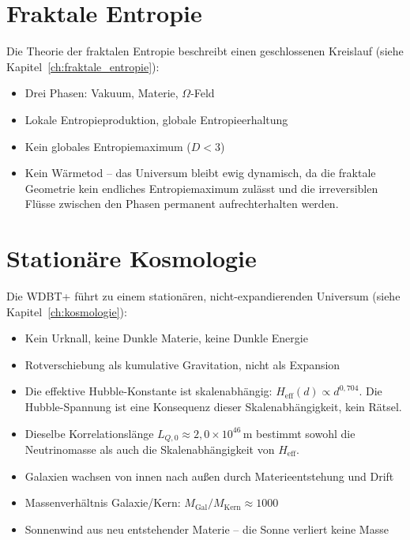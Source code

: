 \section{Fraktale Entropie}
\label{sec:entropie_zf}

Die Theorie der fraktalen Entropie beschreibt einen geschlossenen Kreislauf (siehe Kapitel~\ref{ch:fraktale_entropie}):

\begin{itemize}
    \item Drei Phasen: Vakuum, Materie, \( \Omega \)-Feld
    \item Lokale Entropieproduktion, globale Entropieerhaltung
    \item Kein globales Entropiemaximum (\( D < 3 \))
    \item Kein Wärmetod – das Universum bleibt ewig dynamisch, da die fraktale Geometrie kein endliches Entropiemaximum zulässt und die irreversiblen Flüsse zwischen den Phasen permanent aufrechterhalten werden.
\end{itemize}

\section{Stationäre Kosmologie}
\label{sec:kosmologie_zf}

Die WDBT+ führt zu einem stationären, nicht-expandierenden Universum (siehe Kapitel~\ref{ch:kosmologie}):

\begin{itemize}
    \item Kein Urknall, keine Dunkle Materie, keine Dunkle Energie
    \item Rotverschiebung als kumulative Gravitation, nicht als Expansion
    \item Die effektive Hubble-Konstante ist skalenabhängig: \( H_{\text{eff}}(d) \propto d^{0,704} \). Die Hubble-Spannung ist eine Konsequenz dieser Skalenabhängigkeit, kein Rätsel.
    \item Dieselbe Korrelationslänge \( L_{Q,0} \approx 2{,}0 \times 10^{46} \, \text{m} \) bestimmt sowohl die Neutrinomasse als auch die Skalenabhängigkeit von \( H_{\text{eff}} \).
    \item Galaxien wachsen von innen nach außen durch Materieentstehung und Drift
    \item Massenverhältnis Galaxie/Kern: \( M_{\text{Gal}}/M_{\text{Kern}} \approx 1000 \)
    \item Sonnenwind aus neu entstehender Materie – die Sonne verliert keine Masse
\end{itemize}


